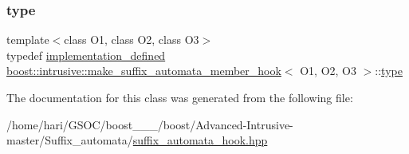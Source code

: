 \mbox{\label{classboost_1_1intrusive_1_1make__suffix__automata__member__hook_a01166563956b1d994be6c34cba43efc1}} 
\subsubsection{\texorpdfstring{type}{type}}
{\footnotesize\ttfamily template$<$class O1, class O2, class O3$>$ \\
typedef \hyperlink{classboost_1_1intrusive_1_1make__suffix__automata__member__hook_aca176c172e71c868f0cbcfbd2d1d6577}{implementation\+\_\+defined} \hyperlink{classboost_1_1intrusive_1_1make__suffix__automata__member__hook}{boost\+::intrusive\+::make\+\_\+suffix\+\_\+automata\+\_\+member\+\_\+hook}$<$ O1, O2, O3 $>$\+::\hyperlink{classboost_1_1intrusive_1_1make__suffix__automata__member__hook_a01166563956b1d994be6c34cba43efc1}{type}}



The documentation for this class was generated from the following file\+:\begin{DoxyCompactItemize}
\item 
/home/hari/\+G\+S\+O\+C/boost\+\_\+\_\+\_/boost/\+Advanced-\/\+Intrusive-\/master/\+Suffix\+\_\+automata/\hyperlink{suffix__automata__hook_8hpp}{suffix\+\_\+automata\+\_\+hook.\+hpp}\end{DoxyCompactItemize}
